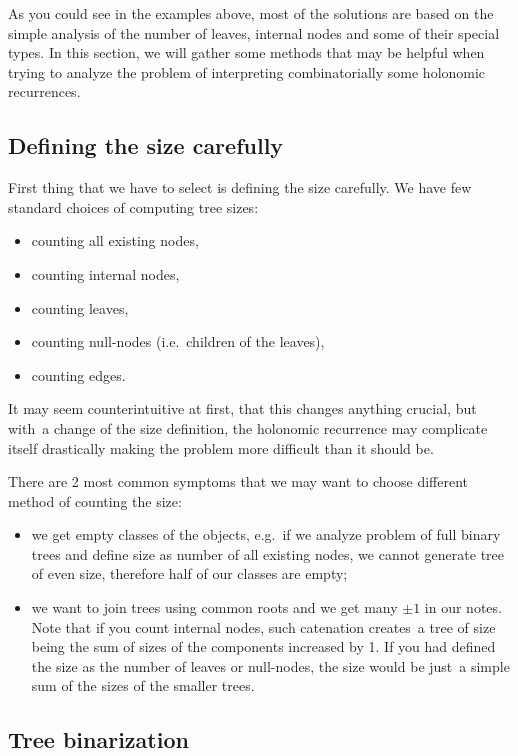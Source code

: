 \documentclass[final]{article}
\theoremstyle{definition}
\theoremstyle{definition}
\theoremstyle{remark}
\begin{document}
As you could see in the examples above, most of the solutions are based on the simple analysis of the number of leaves, internal nodes and some of their special types. In this section, we will gather some methods that may be helpful when trying to analyze the problem of interpreting combinatorially some holonomic recurrences.

\subsection{Defining the size carefully}%
\label{sub:defining_the_size_carefully}

First thing that we have to select is defining the size carefully. We have few standard choices of computing tree sizes:
\begin{itemize}
    \item counting all existing nodes,
    \item counting internal nodes,
    \item counting leaves,
    \item counting null-nodes (i.e.~children of the leaves),
    \item counting edges.
\end{itemize}

It may seem counterintuitive at first, that this changes anything crucial, but with~a change of the size definition, the holonomic recurrence may complicate itself drastically making the problem more difficult than it should be.

There are 2 most common symptoms that we may want to choose different method of counting the size:
\begin{itemize}
    \item we get empty classes of the objects, e.g.~if we analyze problem of full binary trees and define size as number of all existing nodes, we cannot generate tree of even size, therefore half of our classes are empty;
    \item we want to join trees using common roots and we get many \(\pm1\) in our notes. Note that if you count internal nodes, such catenation creates~a tree of size being the sum of sizes of the components increased by 1. If you had defined the size as the number of leaves or null-nodes, the size would be just~a simple sum of the sizes of the smaller trees.
\end{itemize}

\subsection{Tree binarization}%
\label{sub:tree_binarization}
\end{document}
